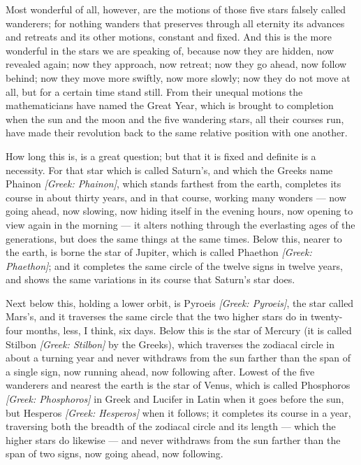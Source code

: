  Most wonderful of all, however, are the motions of those five stars falsely called wanderers; for nothing wanders that preserves through all eternity its advances and retreats and its other motions, constant and fixed. And this is the more wonderful in the stars we are speaking of, because now they are hidden, now revealed again; now they approach, now retreat; now they go ahead, now follow behind; now they move more swiftly, now more slowly; now they do not move at all, but for a certain time stand still. From their unequal motions the mathematicians have named the Great Year, which is brought to completion when the sun and the moon and the five wandering stars, all their courses run, have made their revolution back to the same relative position with one another.

 How long this is, is a great question; but that it is fixed and definite is a necessity. For that star which is called Saturn's, and which the Greeks name Phainon \textit{[Greek: Phainon]}, which stands farthest from the earth, completes its course in about thirty years, and in that course, working many wonders — now going ahead, now slowing, now hiding itself in the evening hours, now opening to view again in the morning — it alters nothing through the everlasting ages of the generations, but does the same things at the same times. Below this, nearer to the earth, is borne the star of Jupiter, which is called Phaethon \textit{[Greek: Phaethon]}; and it completes the same circle of the twelve signs in twelve years, and shows the same variations in its course that Saturn's star does.

 Next below this, holding a lower orbit, is Pyroeis \textit{[Greek: Pyroeis]}, the star called Mars's, and it traverses the same circle that the two higher stars do in twenty-four months, less, I think, six days. Below this is the star of Mercury (it is called Stilbon \textit{[Greek: Stilbon]} by the Greeks), which traverses the zodiacal circle in about a turning year and never withdraws from the sun farther than the span of a single sign, now running ahead, now following after. Lowest of the five wanderers and nearest the earth is the star of Venus, which is called Phosphoros \textit{[Greek: Phosphoros]} in Greek and Lucifer in Latin when it goes before the sun, but Hesperos \textit{[Greek: Hesperos]} when it follows; it completes its course in a year, traversing both the breadth of the zodiacal circle and its length — which the higher stars do likewise — and never withdraws from the sun farther than the span of two signs, now going ahead, now following.

